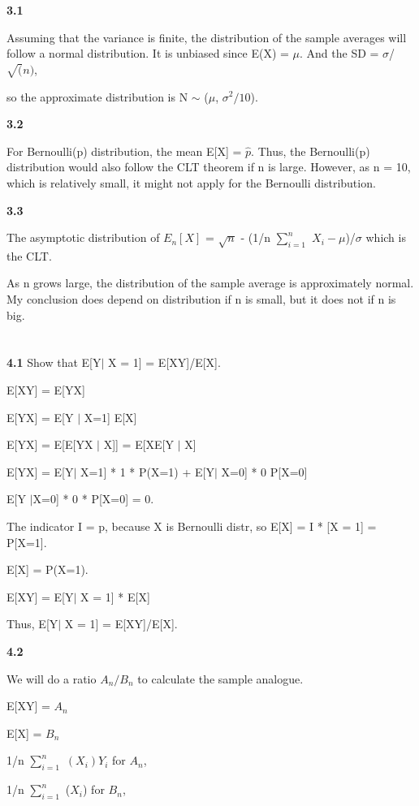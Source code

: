 \textbf{3.1}

Assuming that the variance is finite, the distribution of the sample averages will follow a normal distribution. It is unbiased since E(X) = $\mu$. And the SD = $\sigma$/$\sqrt(n)$,

so the approximate distribution is N $\sim$ ($\mu$, $\sigma^2/10$).

\textbf{3.2}

 For Bernoulli(p) distribution, the mean E[X] = $\hat{p}$. Thus, the Bernoulli(p) distribution would also follow the CLT theorem if n is large. However, as n = 10, which is relatively small, it might not apply for the Bernoulli distribution.

\textbf{3.3}

The asymptotic distribution of $E_{n}[X]$ = $\sqrt{n}$  - (1/n $\sum^n_{i=1}$ $X_{i} - \mu$)/$\sigma$ which is the CLT.

As n grows large, the distribution of the sample average is approximately normal. My conclusion does depend on distribution if n is small, but it does not if n is big.


\section{}

\textbf{4.1} Show that E[Y$\mid$ X = 1] = E[XY]/E[X].

E[XY] = E[YX]

E[YX] = E[Y $\mid$ X=1] E[X]

E[YX] = E[E[YX $\mid$ X]]  = E[XE[Y $\mid$ X]

E[YX] = E[Y$\mid$ X=1] * 1 * P(X=1) + E[Y$\mid$ X=0] * 0 P[X=0]

E[Y $\mid$X=0] * 0 * P[X=0] = 0.

The indicator I = p, because X is Bernoulli distr, so E[X] = I * [X = 1] = P[X=1].

E[X] = P(X=1).

E[XY] = E[Y$\mid$ X = 1] * E[X]

Thus, E[Y$\mid$ X = 1] = E[XY]/E[X].

\textbf{4.2}

We will do a ratio $A_{n} / B_{n}$ to calculate the sample analogue.

E[XY] = $A_{n}$

E[X] = $B_{n}$

1/n $\sum^n_{i=1}$ $(X_{i})Y_{i}$ for $A_{n}$,

1/n $\sum^n_{i=1}$ ($X_{i}$) for $B_n$, 

